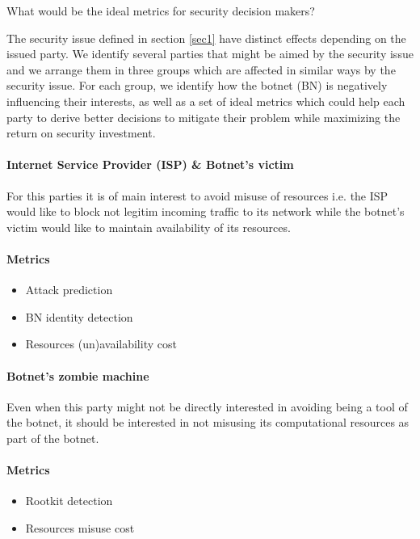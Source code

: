 What would be the ideal metrics for security decision makers?

The security issue defined in section \ref{sec1} have distinct effects depending on the issued party. We identify several parties that might be aimed by the security issue and we arrange them in three groups which are affected in similar ways by the security issue. For each group, we identify how the botnet (BN) is negatively influencing their interests, as well as a set of ideal metrics which could help each party to derive better decisions to mitigate their problem while maximizing the return on security investment.

\indent
\paragraph{Internet Service Provider (ISP) \& Botnet's victim}
For this parties it is of main interest to avoid misuse of resources i.e. the ISP would like to block not legitim incoming traffic to its network while the botnet's victim would like to maintain availability of its resources.
\paragraph{Metrics}
\begin{itemize}
    \item Attack prediction
    \item BN identity detection
    \item Resources (un)availability cost
\end{itemize}
\indent
\paragraph{Botnet's zombie machine}
Even when this party might not be directly interested in avoiding being a tool of the botnet, it should be interested in not misusing its computational resources as part of the botnet.
\paragraph{Metrics}
\begin{itemize}
    \item Rootkit detection
    \item Resources misuse cost
\end{itemize}
\indent
